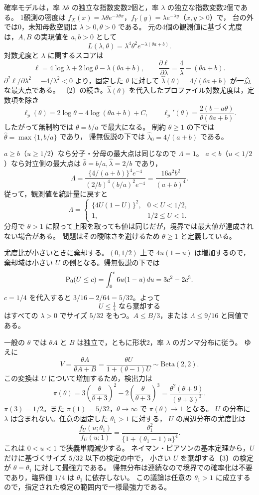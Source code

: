 \documentclass[a4paper,11pt]{ltjsarticle}
\begin{document}
確率モデルは，率 $\lambda\theta$ の独立な指数変数2個と，率 $\lambda$ の独立な指数変数2個である。
1観測の密度は $f_X(x)=\lambda\theta e^{-\lambda\theta x}$，$f_Y(y)=\lambda e^{-\lambda y}$（$x,y>0$）で，
台の外では0，未知母数空間は $\lambda>0,\theta>0$ である。
元の4個の観測値に基づく尤度は，$A,B$ の実現値を $a,b>0$ として
\[
L(\lambda,\theta)=\boxed{\lambda^4\theta^2e^{-\lambda(\theta a+b)}}.
\]
対数尤度と $\lambda$ に関するスコアは
\[
\ell=4\log\lambda+2\log\theta-\lambda(\theta a+b),\qquad
\frac{\partial\ell}{\partial\lambda}=\frac4\lambda-(\theta a+b).
\]
$\partial^2\ell/\partial\lambda^2=-4/\lambda^2<0$ より，固定した $\theta$ に対して
$\hat\lambda(\theta)=4/(\theta a+b)$ が一意な最大点である。
\newpage
{}
〔2〕の続き。$\hat\lambda(\theta)$ を代入したプロファイル対数尤度は，定数項を除き
\[
\ell_p(\theta)=2\log\theta-4\log(\theta a+b)+C,
\qquad
\ell_p'(\theta)=\frac{2(b-a\theta)}{\theta(\theta a+b)}.
\]
したがって無制約では $\theta=b/a$ で最大になる。
制約 $\theta\geq1$ の下では $\hat\theta=\max\{1,b/a\}$ であり，
帰無仮説の下では $\hat\lambda_0=4/(a+b)$ である。

$a\geq b$（$u\geq1/2$）なら分子・分母の最大点は同じなので $\Lambda=1$。
$a<b$（$u<1/2$）なら対立側の最大点は $\hat\theta=b/a,\hat\lambda=2/b$ であり，
\[
\Lambda=\frac{\{4/(a+b)\}^4e^{-4}}
{(2/b)^4(b/a)^2e^{-4}}=\frac{16a^2b^2}{(a+b)^4}.
\]
従って，観測値を統計量に戻すと
\[
\boxed{\Lambda=
\begin{cases}
\{4U(1-U)\}^2,&0<U<1/2,\\
1,&1/2\leq U<1.
\end{cases}}
\]
分母で $\theta>1$ に限って上限を取っても値は同じだが，境界では最大値が達成されない場合がある。
問題はその曖昧さを避けるため $\theta\geq1$ と定義している。

尤度比が小さいときに棄却する。$(0,1/2)$ 上で $4u(1-u)$ は増加するので，
棄却域は小さい $U$ の側となる。帰無仮説の下では
\[
\operatorname{P}_0(U\leq c)=\int_0^c6u(1-u)\,du=3c^2-2c^3.
\]
$c=1/4$ を代入すると $3/16-2/64=5/32$。よって
\[
\boxed{U\leq\tfrac14\text{ なら棄却する}}
\]
はすべての $\lambda>0$ でサイズ $5/32$ をもつ。$A\leq B/3$，または $\Lambda\leq9/16$ と同値である。

一般の $\theta$ では $\theta A$ と $B$ は独立で，ともに形状2，率 $\lambda$ のガンマ分布に従う。
ゆえに
\[
V=\frac{\theta A}{\theta A+B}
=\frac{\theta U}{1+(\theta-1)U}\sim\mathrm{Beta}(2,2).
\]
この変換は $U$ について増加するため，検出力は
\[
\boxed{\pi(\theta)=3\left(\frac{\theta}{\theta+3}\right)^2
-2\left(\frac{\theta}{\theta+3}\right)^3
=\frac{\theta^2(\theta+9)}{(\theta+3)^3}}.
\]
$\boxed{\pi(3)=1/2}$。また $\pi(1)=5/32$，$\theta\to\infty$ で $\pi(\theta)\to1$ となる。
\newpage
{}
$U$ の分布に $\lambda$ は含まれない。任意の固定した $\theta_1>1$ に対する，
$U$ の周辺分布の尤度比は
\[
\frac{f_U(u;\theta_1)}{f_U(u;1)}
=\frac{\theta_1^2}{\{1+(\theta_1-1)u\}^4}.
\]
これは $0<u<1$ で狭義単調減少する。
ネイマン・ピアソンの基本定理から，$U$ だけに基づくサイズ $5/32$ 以下の検定の中で，
小さい $U$ を棄却する〔3〕の検定が $\theta=\theta_1$ に対して最強力である。
帰無分布は連続なので境界での確率化は不要であり，臨界値 $1/4$ は $\theta_1$ に依存しない。
この議論は任意の $\theta_1>1$ に成立するので，指定された検定の範囲内で一様最強力である。
\end{document}
